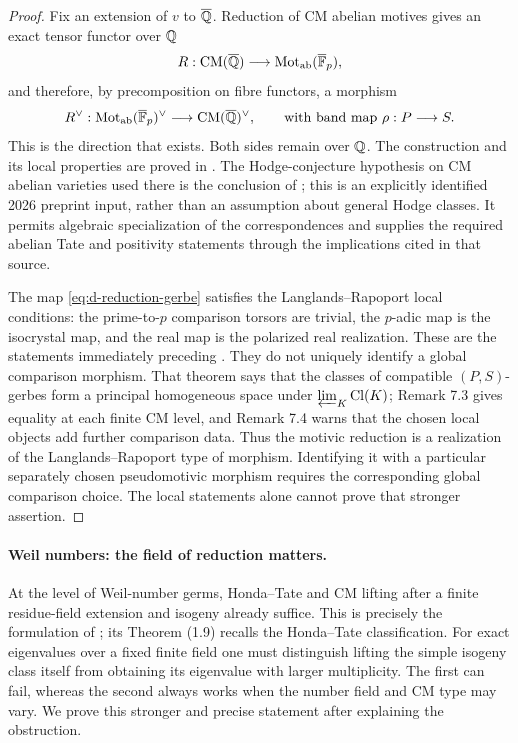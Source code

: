\begin{proof}
Fix an extension of $v$ to $\overline{\mathbb Q}$.  Reduction of CM abelian
motives gives an exact tensor functor over $\mathbb Q$
\[
 R:\operatorname{CM}(\overline{\mathbb Q})\longrightarrow
       \operatorname{Mot}_{\mathrm{ab}}(\overline{\mathbb F}_p),
\]
and therefore, by precomposition on fibre functors, a morphism
\begin{equation}
 R^\vee:\operatorname{Mot}_{\mathrm{ab}}(\overline{\mathbb F}_p)^\vee
    \longrightarrow\operatorname{CM}(\overline{\mathbb Q})^\vee,
 \qquad\text{with band map }\rho:P\longrightarrow S.
 \label{eq:d-reduction-gerbe}
\end{equation}
This is the direction that exists.  Both sides remain over $\mathbb Q$.
The construction and its local properties are proved in
\citet[\S7, pp.~39--40]{AMilne2003}.  The Hodge-conjecture hypothesis
on CM abelian varieties used there is the conclusion of
\citet[Theorem I]{AvanHoftenSempliner2026}; this is an explicitly
identified 2026 preprint input, rather than an assumption about general
Hodge classes.  It permits algebraic specialization of the
correspondences and supplies the required abelian Tate and positivity
statements through the implications cited in that source.

The map \eqref{eq:d-reduction-gerbe} satisfies the Langlands--Rapoport
local conditions: the prime-to-$p$ comparison torsors are trivial,
the $p$-adic map is the isocrystal map, and the real map is the
polarized real realization.  These are the statements immediately
preceding \citet[Theorem 7.2]{AMilne2003}.  They do not uniquely
identify a global comparison morphism.  That theorem says that the
classes of compatible $(P,S)$-gerbes form a principal homogeneous
space under $\varprojlim_K\operatorname{Cl}(K)$; Remark 7.3 gives equality at each
finite CM level, and Remark 7.4 warns that the chosen local objects add
further comparison data.  Thus the motivic reduction is a realization
of the Langlands--Rapoport type of morphism.  Identifying it with a
particular separately chosen pseudomotivic morphism requires the
corresponding global comparison choice.  The local statements alone
cannot prove that stronger assertion.
\end{proof}

\paragraph{Weil numbers: the field of reduction matters.}
At the level of Weil-number germs, Honda--Tate and CM lifting after
a finite residue-field extension and isogeny already suffice.  This
is precisely the formulation of \citet[Theorem (1.7)]{DOort2009};
its Theorem (1.9) recalls the Honda--Tate classification.  For exact
eigenvalues over a fixed finite field one must distinguish lifting
the simple isogeny class itself from obtaining its eigenvalue with
larger multiplicity.  The first can fail, whereas the second always
works when the number field and CM type may vary.  We prove this
stronger and precise statement after explaining the obstruction.

